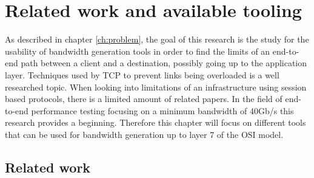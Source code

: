 \chapter{Related work and available tooling}\label{ch:related}
As described in chapter \ref{ch:problem}, the goal of this research is the study for the usability of bandwidth generation tools in order to find the limits of an end-to-end path between a client and a destination, possibly going up to the application layer.
Techniques used by TCP to prevent links being overloaded is a well researched topic. 
When looking into limitations of an infrastructure using session based protocols, there is a limited amount of related papers. 
In the field of end-to-end performance testing focusing on a minimum bandwidth of 40Gb/s this research provides a beginning.
Therefore this chapter will focus on different tools that can be used for bandwidth generation up to layer 7 of the OSI model.

\section{Related work}

